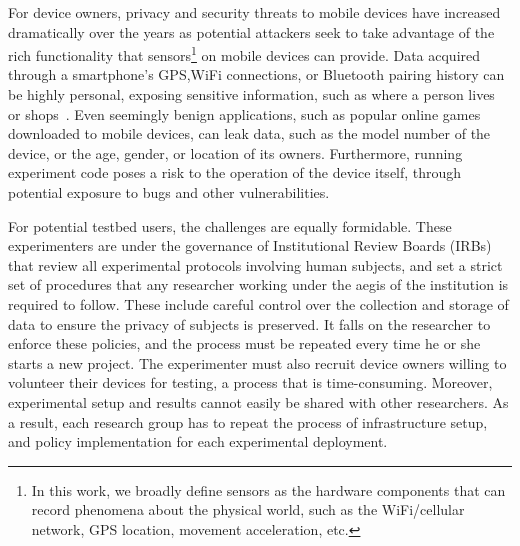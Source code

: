 For device owners, privacy and security threats to mobile devices have
increased dramatically over the years as potential attackers seek
to take advantage of the rich functionality that %
sensors\footnote{\scriptsize In this work, we broadly define sensors
as the hardware components that can record phenomena about the
physical world, such as the WiFi/cellular network, GPS location,
movement acceleration, etc.} on mobile devices can provide.
Data acquired through a smartphone's GPS,WiFi
connections, or Bluetooth pairing history can be highly personal,
exposing sensitive information, such as where a person lives or 
shops~\cite{han2012accomplice}. Even seemingly benign applications, 
such as popular online games downloaded to mobile devices, can
leak data, such as the model number of the device, or the age, gender, 
or location of its owners.  Furthermore, running experiment code poses 
a risk to the operation of the device itself, through potential exposure 
to bugs and other vulnerabilities. 

For potential testbed users, the challenges are equally formidable. 
These experimenters are under the governance of Institutional 
Review Boards (IRBs)~\cite{irb} that
review all experimental protocols involving human subjects,
and set a strict set of procedures that any researcher working under
the aegis of the institution is required to follow. These include
careful control over the collection and storage of data to ensure the 
privacy of subjects is preserved. It falls on the researcher to enforce 
these policies, and the process must be repeated every time he or 
she starts a new project. The experimenter must also recruit device 
owners willing to volunteer their devices for testing, a process that 
is time-consuming. Moreover, experimental setup and results cannot 
easily be shared with other researchers. As a result, each research 
group has to repeat the process of infrastructure setup, and policy 
implementation for each experimental deployment.

